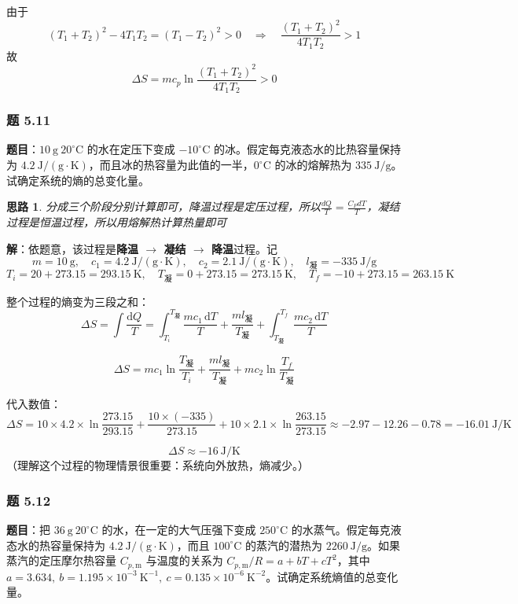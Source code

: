 \documentclass[UTF8]{ctexart}
\newtheorem{thoughts}{思路}[subsection]
\begin{document}
由于
\[
(T_1+T_2)^2-4T_1T_2=(T_1-T_2)^2>0
\quad\Longrightarrow\quad
\frac{(T_1+T_2)^2}{4T_1T_2}>1
\]
故
\[
\boxed{\Delta S=mc_p\ln\frac{(T_1+T_2)^2}{4T_1T_2}>0}
\]

\subsubsection{题 5.11}

\textbf{题目}：$10\ \mathrm{g}\ 20^{\circ}\mathrm{C}$ 的水在定压下变成 $-10^{\circ}\mathrm{C}$ 的冰。假定每克液态水的比热容量保持为 $4.2\ \mathrm{J/(g\cdot K)}$，而且冰的热容量为此值的一半，$0^{\circ}\mathrm{C}$ 的冰的熔解热为 $335\ \mathrm{J/g}$。试确定系统的熵的总变化量。

\begin{thoughts}
  分成三个阶段分别计算即可，降温过程是定压过程，所以$\frac{dQ}{T} = \frac{C_PdT}{T}$，凝结过程是恒温过程，所以用熔解热计算热量即可
\end{thoughts}

\textbf{解}：依题意，该过程是\textbf{降温 $\to$ 凝结 $\to$ 降温}过程。记
\[
m=10\ \mathrm{g},\quad c_1=4.2\ \mathrm{J/(g\cdot K)},\quad
c_2=2.1\ \mathrm{J/(g\cdot K)},\quad l_{\text{凝}}=-335\ \mathrm{J/g}
\]
\[
T_i=20+273.15=293.15\ \mathrm{K},\quad
T_{\text{凝}}=0+273.15=273.15\ \mathrm{K},\quad
T_f=-10+273.15=263.15\ \mathrm{K}
\]

整个过程的熵变为三段之和：
\[
\Delta S=\int\frac{\mathrm{d}Q}{T}
=\int_{T_i}^{T_{\text{凝}}}\frac{mc_1\,\mathrm{d}T}{T}
+\frac{ml_{\text{凝}}}{T_{\text{凝}}}
+\int_{T_{\text{凝}}}^{T_f}\frac{mc_2\,\mathrm{d}T}{T}
\]

\[
\Delta S=mc_1\ln\frac{T_{\text{凝}}}{T_i}
+\frac{ml_{\text{凝}}}{T_{\text{凝}}}
+mc_2\ln\frac{T_f}{T_{\text{凝}}}
\]

代入数值：
\[
\Delta S=10\times 4.2\times\ln\frac{273.15}{293.15}
+\frac{10\times(-335)}{273.15}
+10\times 2.1\times\ln\frac{263.15}{273.15}
\approx -2.97-12.26-0.78=-16.01\ \mathrm{J/K}
\]

\[
\boxed{\Delta S\approx -16\ \mathrm{J/K}}
\]
（理解这个过程的物理情景很重要：系统向外放热，熵减少。）

\subsubsection{题 5.12}

\textbf{题目}：把 $36\ \mathrm{g}\ 20^{\circ}\mathrm{C}$ 的水，在一定的大气压强下变成 $250^{\circ}\mathrm{C}$ 的水蒸气。假定每克液态水的热容量保持为 $4.2\ \mathrm{J/(g\cdot K)}$，而且 $100^{\circ}\mathrm{C}$ 的蒸汽的潜热为 $2260\ \mathrm{J/g}$。如果蒸汽的定压摩尔热容量 $C_{p,\mathrm{m}}$ 与温度的关系为 $C_{p,\mathrm{m}}/R=a+bT+cT^2$，其中 $a=3.634,\ b=1.195\times 10^{-3}\ \mathrm{K}^{-1},\ c=0.135\times 10^{-6}\ \mathrm{K}^{-2}$。试确定系统熵值的总变化量。
\end{document}
